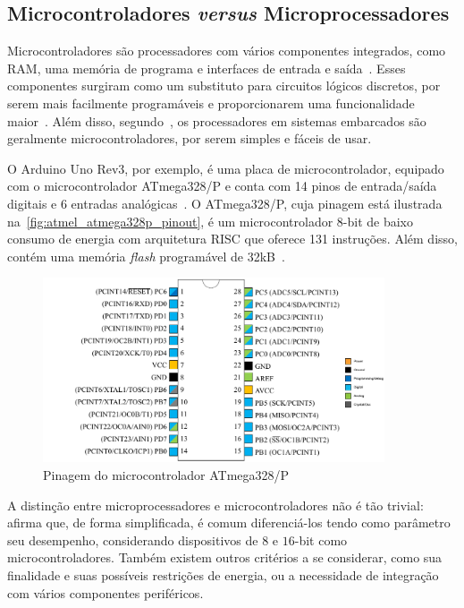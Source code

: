 \subsection{Microcontroladores \textit{versus} Microprocessadores}

Microcontroladores são processadores com vários componentes integrados, como RAM, uma memória de programa e interfaces de entrada e saída~\cite{white:2011}. Esses componentes surgiram como um substituto para circuitos lógicos discretos, por serem mais facilmente programáveis e proporcionarem uma funcionalidade maior~\cite{heath:2002}. Além disso, segundo~, os processadores em sistemas embarcados são geralmente microcontroladores, por serem simples e fáceis de usar.

O Arduino Uno Rev3, por exemplo, é uma placa de microcontrolador, equipado com o microcontrolador ATmega328/P e conta com 14 pinos de entrada/saída digitais e 6 entradas analógicas~\cite{arduino:uno_store}.
% 
O ATmega328/P, cuja pinagem está ilustrada na~\autoref{fig:atmel_atmega328p_pinout}, é um microcontrolador 8-bit de baixo consumo de energia com arquitetura RISC que oferece 131 instruções. Além disso, contém uma memória \textit{flash} programável de 32kB~\cite{atmel:2016atmega328p}.

\begin{figure}[ht]
	\caption{\label{fig:atmel_atmega328p_pinout}Pinagem do microcontrolador ATmega328/P}
	\begin{center}
	    \includegraphics[width=0.9\textwidth]{resources/atmel_atmega328_pinout}
	\end{center}
\end{figure}

A distinção entre microprocessadores e microcontroladores não é tão trivial:~ afirma que, de forma simplificada, é comum diferenciá-los tendo como parâmetro seu desempenho, considerando dispositivos de \(8\) e \(16\)-bit como microcontroladores. Também existem outros critérios a se considerar, como sua finalidade e suas possíveis restrições de energia, ou a necessidade de integração com vários componentes periféricos.

